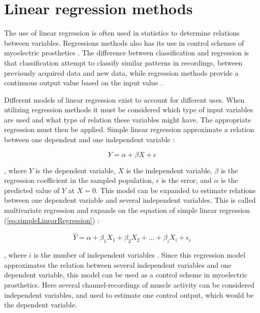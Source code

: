 \section{Linear regression methods}

The use of linear regression is often used in statistics to determine relations between variables. Regressions methods also has its use in control schemes of myoelectric prosthetics \cite{Hwang2017, Bruun2017, Hahne2014}. The difference between classification and regression is that classification attempt to classify similar patterns in recordings, between previously acquired data and new data, while regression methods provide a continuous output value based on the input value \cite{Mendez2017, Hahne2014}. %

Different models of linear regression exist to account for different uses. When utilizing regression methods it must be considered which type of input variables are used and what type of relation these variables might have. The appropriate regression must then be applied. Simple linear regression approximate a relation between one dependent and one independent variable \cite{Zar2009}:

\begin{equation} \label{eq:simpleLinearRegression}
Y = \alpha + \beta X + \epsilon
\end{equation}

, where $Y$ is the dependent variable, $X$ is the independent variable, $\beta$ is the regression coefficient in the sampled population, $\epsilon$ is the error, and $\alpha$ is the predicted value of $Y$ at $X = 0$.
This model can be expanded to estimate relations between one dependent variable and several independent variables. This is called multivariate regression and expands on the equation of simple linear regression (\eqref{eq:simpleLinearRegression}) \cite{Zar2009}:

\begin{equation} \label{eq:multiLinearRegression}
\hat{Y} = \alpha + \beta_1 X_{1} + \beta_2 X_{2} + ... + \beta_i X_{i} + \epsilon_i
\end{equation} 

, where $i$ is the number of independent variables \cite{Zar2009}. Since this regression model approximates the relation between several independent variables and one dependent variable, this model can be used as a control scheme in myoelectric prosthetics. Here several channel-recordings of muscle activity can be considered independent variables, and used to estimate one control output, which would be the dependent variable. \cite{Bruun2017}